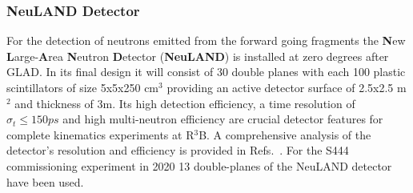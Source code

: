 \subsubsection{NeuLAND Detector}
For the detection of neutrons emitted from the forward going fragments  the \textbf{N}ew \textbf{L}arge-\textbf{A}rea \textbf{N}eutron \textbf{D}etector (\textbf{NeuLAND}) is installed at zero degrees after GLAD. In its final design it will consist of 30 double planes with each 100 plastic scintillators of size 5x5x250 cm$^3$ providing an active detector surface of 2.5x2.5 m$^2$ and thickness of 3m. Its high detection efficiency, a time resolution of $\sigma_t \le 150 ps$ and high multi-neutron efficiency are crucial detector features for complete kinematics experiments at R$^3$B. A comprehensive analysis of the detector's resolution and efficiency is provided in Refs.~\cite{boretzky2021neuland, boretzky2014neuland}.\newline
For the S444 commissioning experiment in 2020 13 double-planes of the NeuLAND detector have been used. 
\newpage


